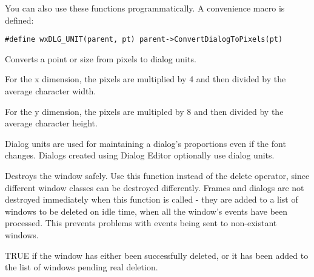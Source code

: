 You can also use these functions programmatically. A convenience macro is defined:

{\small
\begin{verbatim}
#define wxDLG_UNIT(parent, pt) parent->ConvertDialogToPixels(pt)
\end{verbatim}
}



\label{wxwindowconvertpixelstodialog}



Converts a point or size from pixels to dialog units.

For the x dimension, the pixels are multiplied by 4 and then divided by the average
character width.

For the y dimension, the pixels are multipled by 8 and then divided by the average
character height.


Dialog units are used for maintaining a dialog's proportions even if the font changes.
Dialogs created using Dialog Editor optionally use dialog units.



\label{wxwindowdestroy}


Destroys the window safely. Use this function instead of the delete operator, since
different window classes can be destroyed differently. Frames and dialogs
are not destroyed immediately when this function is called - they are added
to a list of windows to be deleted on idle time, when all the window's events
have been processed. This prevents problems with events being sent to non-existant
windows.


TRUE if the window has either been successfully deleted, or it has been added
to the list of windows pending real deletion.


